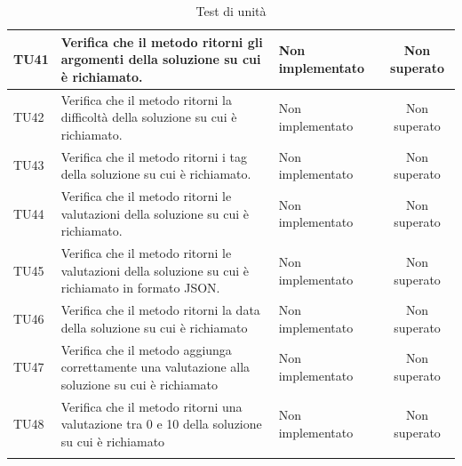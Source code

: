 \begin{longtable}{|>{\centering\arraybackslash}m{1.6cm}|>{\centering\arraybackslash}m{6.41cm}|>{\centering\arraybackslash}m{3.1cm}| c |}
		TU41 & Verifica che il metodo ritorni gli argomenti della soluzione su cui è richiamato. & Non implementato & Non superato \\ \hline
		TU42 & Verifica che il metodo ritorni la difficoltà della soluzione su cui è richiamato. & Non implementato & Non superato \\ \hline
		TU43 & Verifica che il metodo ritorni i tag della soluzione su cui è richiamato. & Non implementato & Non superato \\ \hline
		TU44 & Verifica che il metodo ritorni le valutazioni della soluzione su cui è richiamato. & Non implementato & Non superato \\ \hline
		TU45 & Verifica che il metodo ritorni le valutazioni della soluzione su cui è richiamato in formato JSON. & Non implementato & Non superato \\ \hline
		TU46 & Verifica che il metodo ritorni la data della soluzione su cui è richiamato & Non implementato & Non superato \\ \hline
		TU47 & Verifica che il metodo aggiunga correttamente una valutazione alla soluzione su cui è richiamato & Non implementato & Non superato \\ \hline
		TU48 & Verifica che il metodo ritorni una valutazione tra 0 e 10 della soluzione su cui è richiamato & Non implementato & Non superato \\ \hline
		\caption{Test di unità}
\end{longtable}

